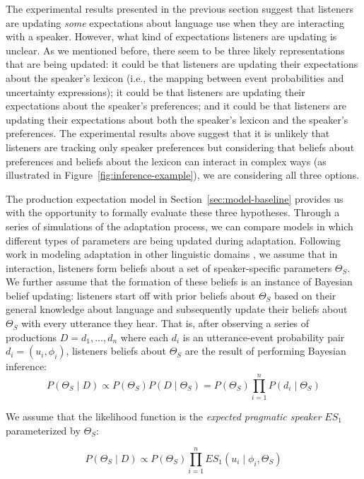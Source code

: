 \documentclass[lucida,biblatex]{sp} %
\newcommand{\figref}[1]{Figure~\ref{#1}}
\newcommand{\sectionref}[1]{Section~\ref{#1}}
\begin{document}
The experimental results presented in the previous section suggest that listeners are updating 
\textit{some} expectations about language use when they are interacting with a speaker. 
However, what kind of expectations listeners are updating is unclear. As we mentioned before, 
there seem to be three likely representations that are being updated: 
it could be that listeners are updating their expectations about the speaker's lexicon 
(i.e., the mapping between event probabilities and uncertainty expressions); 
it could be that listeners are updating their expectations about the speaker's preferences; 
and it could be that listeners are updating their expectations about both the speaker's lexicon 
and the speaker's preferences. The experimental results above suggest that it is unlikely that listeners are tracking only speaker preferences but considering
that beliefs about preferences and beliefs about the lexicon can interact in complex ways (as illustrated in \figref{fig:inference-example}), we are considering all three options.

The production expectation model in \sectionref{sec:model-baseline} provides us with the opportunity to formally evaluate these three hypotheses.
Through a series of simulations of the adaptation process, we can compare models in which different types of parameters are
being updated during adaptation. Following work in modeling adaptation in other linguistic domains \citep[e.g.,][]{Kleinschmidt2012,Kleinschmidt2015}, 
we assume that in interaction, listeners form beliefs about a set of speaker-specific parameters $\Theta_S$. 
We further assume that the formation of these beliefs is an instance of Bayesian belief updating:
listeners start off with prior beliefs about $\Theta_S$ based on their general knowledge about 
language and subsequently update their beliefs about $\Theta_S$ with every utterance they hear. 
That is, after observing a series of productions $D={d_1, ..., d_n}$ where each $d_i$ is an 
utterance-event probability pair $d_i = (u_i, \phi_i)$, listeners beliefs about $\Theta_S$ are the result
of performing Bayesian inference:
$$P(\Theta_S \mid D) \propto P(\Theta_S) P(D \mid \Theta_S) = P(\Theta_S) \prod_{i=1}^nP(d_i \mid \Theta_S) $$

\noindent We assume that the likelihood function is the \textit{expected pragmatic speaker} $ES_1$ parameterized by $\Theta_S$:

$$P(\Theta_S \mid D) \propto P(\Theta_S)  \prod_{i=1}^n ES_1(u_i \mid \phi_i, \Theta_S) $$
\end{document}
